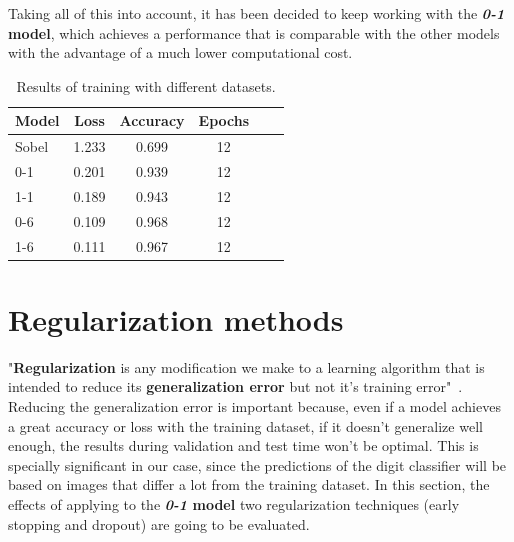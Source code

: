 Taking all of this into account, it has been decided to keep working with the \textbf{\textit{0-1} model}, which achieves a performance that is comparable with the other models with the advantage of a much lower computational cost.

\begin{table}
	\centering
	\begin{tabular}{l*{4}{c}r}
		\textbf{Model} & \textbf{Loss} & \textbf{Accuracy} & \textbf{Epochs} \\
		\hline
		Sobel & 1.233 & 0.699 & 12 \\
		0-1 & 0.201 & 0.939 & 12 \\
		1-1 & 0.189 & 0.943 & 12 \\
		0-6 & 0.109 & 0.968 & 12 \\
		1-6 & 0.111 & 0.967 & 12 \\
	\end{tabular}
	\caption{Results of training with different datasets.}
	\label{tbl:datasets}
\end{table}

\section{Regularization methods}
"\textbf{Regularization} is any modification we make to a learning algorithm that is intended to reduce its \textbf{generalization error} but not it's training error"~\cite{Goodfellow-et-al-2016}. Reducing the generalization error is important because, even if a model achieves a great accuracy or loss with the training dataset, if it doesn't generalize well enough, the results during validation and test time won't be optimal. This is specially significant in our case, since the predictions of the digit classifier will be based on images that differ a lot from the training dataset. In this section, the effects of applying to the \textbf{\textit{0-1} model} two regularization techniques (early stopping and dropout) are going to be evaluated. 

